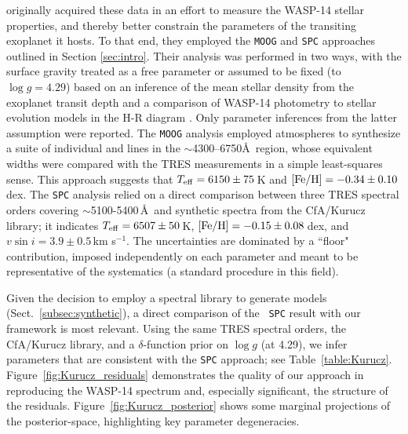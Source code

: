 \documentclass[iop,floatfix,twocolappendix]{emulateapj}
\begin{document}
\citet{torres12} originally acquired these data in an effort to measure the WASP-14 stellar 
properties, and thereby better constrain the parameters of the transiting exoplanet it hosts.  To 
that end, they employed the {\tt MOOG} and {\tt SPC} approaches outlined in Section 
\ref{sec:intro}.  Their analysis was performed in two ways, with the surface gravity treated as a 
free parameter or assumed to be fixed (to $\log g = 4.29$) based on an inference of the mean 
stellar density from the exoplanet transit depth and a comparison of WASP-14 photometry to stellar 
evolution models in the H-R diagram \citep{joshi09}.  Only parameter inferences from the latter 
assumption were reported.  The {\tt MOOG} analysis employed \citet{kurucz93} atmospheres to 
synthesize a suite of individual  and  lines in the $\sim$4300--6750\AA\ 
region, whose equivalent widths were compared with the TRES measurements in a simple least-squares 
sense.  This approach suggests that $T_{\rm eff} = 6150\pm75$\,K and $[{\rm Fe/H}] = 
-0.34\pm0.10$\,dex.  The {\tt SPC} analysis relied on a direct comparison between three TRES 
spectral orders covering $\sim$5100-5400\,\AA\ and synthetic spectra from the {\sc CfA/Kurucz} 
library; it indicates $T_{\rm eff} = 6507\pm50$\,K, $[{\rm Fe/H}] = -0.15\pm0.08$\,dex, and $v \sin 
i = 3.9\pm0.5$\,km s$^{-1}$.  The uncertainties are dominated by a ``floor" contribution, imposed 
independently on each parameter and meant to be representative of the systematics (a standard 
procedure in this field).  

Given the decision to employ a spectral library to generate models (Sect.~\ref{subsec:synthetic}), 
a direct comparison of the \citeauthor{torres12}~{\tt SPC} result with our framework is most 
relevant.  Using the same TRES spectral orders, the {\sc CfA/Kurucz} library, and a 
$\delta$-function prior on $\log g$ (at 4.29), we infer parameters that are consistent with the 
{\tt SPC} approach; see Table~\ref{table:Kurucz}.  Figure~\ref{fig:Kurucz_residuals} demonstrates 
the quality of our approach in reproducing the WASP-14 spectrum and, especially significant, the 
structure of the residuals.  Figure~\ref{fig:Kurucz_posterior} shows some marginal projections of 
the posterior-space, highlighting key parameter degeneracies.  
\end{document}

